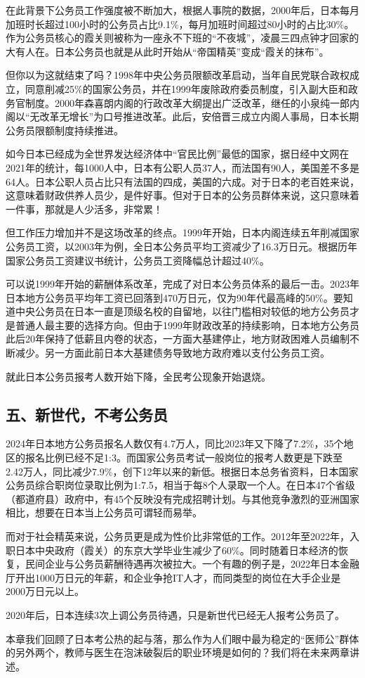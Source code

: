 在此背景下公务员工作强度被不断加大，根据人事院的数据，2000年后，日本每月加班时长超过100小时的公务员占比9.1\%，每月加班时间超过80小时的占比30\%。作为公务员核心的霞关则被称为一座永不下班的“不夜城”，凌晨三四点钟才回家的大有人在。日本公务员也就是从此时开始从“帝国精英”变成“霞关的抹布”。

但你以为这就结束了吗？1998年中央公务员限额改革启动，当年自民党联合政权成立，同意削减25\%的国家公务员，并在1999年废除政府委员制度，引入副大臣和政务官制度。2000年森喜朗内阁的行政改革大纲提出广泛改革，继任的小泉纯一郎内阁以“无改革无增长”为口号推进改革。此后，安倍晋三成立内阁人事局，日本长期公务员限额制度持续推进。

如今日本已经成为全世界发达经济体中“官民比例”最低的国家，据日经中文网在2021年的统计，每1000人中，日本有公职人员37人，而法国有90人，美国差不多是64人。日本公职人员占比只有法国的四成，美国的六成。对于日本的老百姓来说，这意味着财政供养人员少，是件好事。但对于日本的公务员群体来说，这只意味着一件事，那就是人少活多，非常累！

但工作压力增加并不是这场改革的终点。1999年开始，日本内阁连续五年削减国家公务员工资，以2003年为例，全日本公务员平均工资减少了16.3万日元。根据历年国家公务员工资建议书统计，公务员工资降幅总计超过40\%。

可以说1999年开始的薪酬体系改革，完成了对日本公务员体系的最后一击。2023年日本地方公务员平均年工资已回落到470万日元，仅为90年代最高峰的50\%。要知道中央公务员在日本一直是顶级名校的自留地，以往门槛相对较低的地方公务员才是普通人最主要的选择方向。但由于1999年财政改革的持续影响，日本地方公务员此后20年保持了低薪且内卷的状态，一方面大基建停止，地方财政困难人员编制不断减少。另一方面此前日本大基建债务导致地方政府难以支付公务员工资。

就此日本公务员报考人数开始下降，全民考公现象开始退烧。

\subsection{五、新世代，不考公务员}

2024年日本地方公务员报名人数仅有4.7万人，同比2023年又下降了7.2\%，35个地区的报名比例已经不足1:3。而国家公务员考试一般岗位的报考人数更是下跌至2.42万人，同比减少7.9\%，创下12年以来的新低。根据日本总务省资料，日本国家公务员综合职岗位录取比例为1:7.5，相当于每8个人录取一个人。在日本47个省级（都道府县）政府中，有45个反映没有完成招聘计划。与其他竞争激烈的亚洲国家相比，想要在日本当上公务员可谓轻而易举。

而对于社会精英来说，公务员更是成为性价比非常低的工作。2012年至2022年，入职日本中央政府（霞关）的东京大学毕业生减少了60\%。同时随着日本经济的恢复，民间企业与公务员薪酬待遇再次被拉大。一个有趣的例子是，2022年日本金融厅开出1000万日元的年薪，和企业争抢IT人才，而同类型的岗位在大手企业是2000万日元以上。

2020年后，日本连续3次上调公务员待遇，只是新世代已经无人报考公务员了。

本章我们回顾了日本考公热的起与落，那么作为人们眼中最为稳定的“医师公”群体的另外两个，教师与医生在泡沫破裂后的职业环境是如何的？我们将在未来两章讲述。
